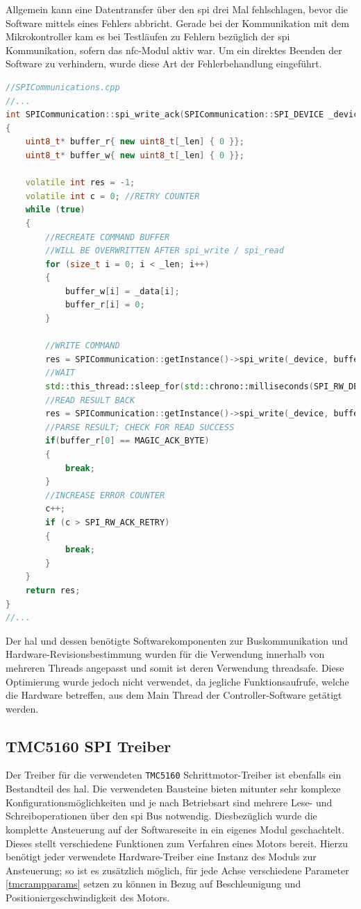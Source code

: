 Allgemein kann eine Datentransfer über den \gls{spi} drei Mal
fehlschlagen, bevor die Software mittels eines Fehlers abbricht. Gerade
bei der Kommunikation mit dem Mikrokontroller kam es bei Testläufen zu
Fehlern bezüglich der \gls{spi} Kommunikation, sofern das
\gls{nfc}-Modul aktiv war. Um ein direktes Beenden der Software zu
verhindern, wurde diese Art der Fehlerbehandlung eingeführt.

\begin{lstlisting}[language={C++}]
//SPICommunications.cpp
//...
int SPICommunication::spi_write_ack(SPICommunication::SPI_DEVICE _device, uint8_t* _data, int _len)
{
    uint8_t* buffer_r{ new uint8_t[_len] { 0 }};
    uint8_t* buffer_w{ new uint8_t[_len] { 0 }};

    volatile int res = -1;
    volatile int c = 0; //RETRY COUNTER
    while (true)
    {
        //RECREATE COMMAND BUFFER
        //WILL BE OVERWRITTEN AFTER spi_write / spi_read
        for (size_t i = 0; i < _len; i++)
        {
            buffer_w[i] = _data[i];
            buffer_r[i] = 0;
        }
        
        //WRITE COMMAND
        res = SPICommunication::getInstance()->spi_write(_device, buffer_w, _len);
        //WAIT
        std::this_thread::sleep_for(std::chrono::milliseconds(SPI_RW_DELAY));
        //READ RESULT BACK
        res = SPICommunication::getInstance()->spi_write(_device, buffer_r, _len);
        //PARSE RESULT; CHECK FOR READ SUCCESS
        if(buffer_r[0] == MAGIC_ACK_BYTE)
        {
            break;
        }
        //INCREASE ERROR COUNTER
        c++;
        if (c > SPI_RW_ACK_RETRY)
        {
            break;
        }
    }
    return res;
}
//...
\end{lstlisting}

Der \gls{hal} und dessen benötigte Softwarekomponenten zur
Buskommunikation und Hardware-Revisionsbestimmung wurden für die
Verwendung innerhalb von mehreren Threads angepasst und somit ist deren
Verwendung threadsafe. Diese Optimierung wurde jedoch nicht verwendet,
da jegliche Funktionsaufrufe, welche die Hardware betreffen, aus dem
Main Thread der Controller-Software getätigt werden.

\hypertarget{tmc5160-spi-treiber}{%
\subsection{TMC5160 SPI Treiber}\label{tmc5160-spi-treiber}}

Der Treiber für die verwendeten \passthrough{\lstinline!TMC5160!}
Schrittmotor-Treiber ist ebenfalls ein Bestandteil des \gls{hal}. Die
verwendeten Bausteine bieten mitunter sehr komplexe
Konfigurationsmöglichkeiten und je nach Betriebsart sind mehrere Lese-
und Schreiboperationen über den \gls{spi} Bus notwendig. Diesbezüglich
wurde die komplette Ansteuerung auf der Softwareseite in ein eigenes
Modul geschachtelt. Dieses stellt verschiedene Funktionen zum Verfahren
eines Motors bereit. Hierzu benötigt jeder verwendete Hardware-Treiber
eine Instanz des Moduls zur Ansteuerung; so ist es zusätzlich möglich,
für jede Achse verschiedene Parameter \ref{tmcrampparams} setzen zu
können in Bezug auf Beschleunigung und Positioniergeschwindigkeit des
Motors.

